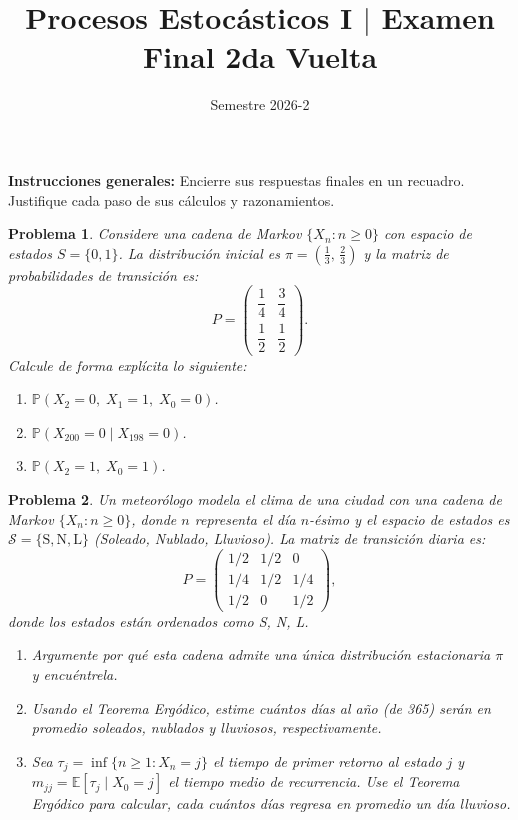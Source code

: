 \documentclass[12pt]{article}
\title{Procesos Estocásticos I $|$ Examen Final 2da Vuelta}
\author{Semestre 2026-2}
\date{}
\newtheorem{problem}{Problema}
\begin{document}
\maketitle
\vspace{-0.8cm}
\scriptsize

\textbf{Instrucciones generales:} Encierre sus respuestas finales en un recuadro. Justifique cada paso de sus cálculos y razonamientos.

\begin{problem}
Considere una cadena de Markov $\{X_n : n \geq 0\}$ con espacio de estados $S = \{0, 1\}$. La distribución inicial
es $\pi = \!\left(\tfrac{1}{3},\, \tfrac{2}{3}\right)$ y la matriz de probabilidades de transición es:
\[
P = \begin{pmatrix}
\dfrac{1}{4} & \dfrac{3}{4} \\[8pt]
\dfrac{1}{2} & \dfrac{1}{2}
\end{pmatrix}.
\]
Calcule de forma explícita lo siguiente:
\begin{enumerate}

    \item[(a)] $\mathbb{P}(X_2 = 0,\; X_1 = 1,\; X_0 = 0)$.

    \item[(b)] $\mathbb{P}(X_{200} = 0 \mid X_{198} = 0)$.

    \item[(c)] $\mathbb{P}(X_2 = 1,\; X_0 = 1)$.
\end{enumerate}
\end{problem}

\begin{problem}
Un meteorólogo modela el clima de una ciudad con una cadena de Markov $\{X_n : n \geq 0\}$, donde
$n$ representa el día $n$-ésimo y el espacio de estados es $\mathcal{S} = \{\text{S}, \text{N}, \text{L}\}$
(Soleado, Nublado, Lluvioso). La matriz de transición diaria es:
\[
P = \begin{pmatrix}
1/2 & 1/2 & 0   \\[4pt]
1/4 & 1/2 & 1/4 \\[4pt]
1/2 & 0   & 1/2
\end{pmatrix},
\]
donde los estados están ordenados como S, N, L.
\begin{enumerate}
    \item[(a)] Argumente por qué esta cadena admite una única distribución estacionaria $\pi$ y encuéntrela.

    \item[(b)] Usando el Teorema Ergódico, estime cuántos días al año (de 365) serán en promedio
        soleados, nublados y lluviosos, respectivamente.

    \item[(c)] Sea $\tau_j = \inf\{n \geq 1 : X_n = j\}$ el tiempo de primer retorno al estado $j$
        y $m_{jj} = \mathbb{E}[\tau_j \mid X_0 = j]$ el tiempo medio de recurrencia. Use el Teorema Ergódico para calcular, cada cuántos días regresa en promedio un día lluvioso.
\end{enumerate}
\end{problem}
\end{document}
